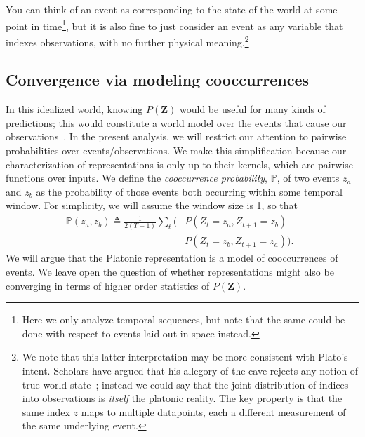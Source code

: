 You can think of an event as corresponding to the state of the world at some point in time\footnote{Here we only analyze temporal sequences, but note that the same could be done with respect to events laid out in space instead.}, but it is also fine to just consider an event as any variable that indexes observations, with no further physical meaning.\footnote{We note that this latter interpretation may be more consistent with Plato's intent. Scholars have argued that his allegory of the cave rejects any notion of true world state~\cite{XX}; instead we could say that the joint distribution of indices into observations is \textit{itself} the platonic reality. The key property is that the same index $z$ maps to multiple datapoints, each a different measurement of the same underlying event.}

\subsection{Convergence via modeling cooccurrences}
In this idealized world, knowing $P(\mathbf{Z})$ would be useful for many kinds of predictions; this would constitute a world model over the events that cause our observations~\cite{XX}. 
In the present analysis, we will restrict our attention to pairwise probabilities over events/observations. We make this simplification because our characterization of representations is only up to their kernels, which are pairwise functions over inputs. We define the \textit{cooccurrence probability}, $\mathbb{P}$, of two events $z_a$ and $z_b$ as the probability of those events both occurring within some temporal window. For simplicity, we will assume the window size is 1, so that
\begin{align}
    \mathbb{P}(z_a, z_b) \triangleq\frac{1}{2(T-1)}\sum_{t} ( & P(Z_t = z_a, Z_{t+1} = z_b) + {} \nonumber \\[-0.8ex]
    & P(Z_t = z_b, Z_{t+1} = z_a)).
\end{align}
We will argue that the Platonic representation is a model of cooccurrences of events. We leave open the question of whether representations might also be converging in terms of higher order statistics of $P(\mathbf{Z})$. 



